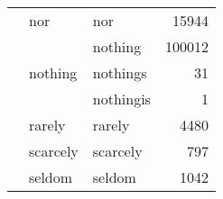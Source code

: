 \begin{longtable}[ht]{lllr}
\cline{2-4}
 & nor & nor & {\cellcolor[HTML]{E9BCF5}} \color[HTML]{000000} 15944 \\
\cline{2-4}
 & \multirow[c]{3}{*}{nothing} & nothing & {\cellcolor[HTML]{5B0081}} \color[HTML]{F1F1F1} 100012 \\
 &  & nothings & {\cellcolor[HTML]{E6E6FA}} \color[HTML]{000000} 31 \\
 &  & nothingis & {\cellcolor[HTML]{E6E6FA}} \color[HTML]{000000} 1 \\
\cline{2-4}
 & rarely & rarely & {\cellcolor[HTML]{E7DAF9}} \color[HTML]{000000} 4480 \\
\cline{2-4}
 & scarcely & scarcely & {\cellcolor[HTML]{E6E5FA}} \color[HTML]{000000} 797 \\
\cline{2-4}
 & seldom & seldom & {\cellcolor[HTML]{E6E4FA}} \color[HTML]{000000} 1042 \\
\cline{1-4} \cline{2-4}
\end{longtable}

